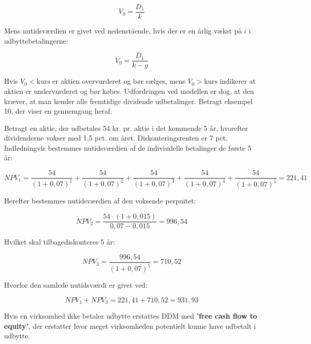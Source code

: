 \documentclass[10pt,reqno, usenames]{article}
\begin{document}
\begin{equation}
        V_0 = \frac{D_1}{k}
\end{equation}

Mens nutidsværdien er givet ved nedenstående, hvis der er en årlig vækst på $i$ i udbyttebetalingerne: 

\begin{equation}
        V_0 = \frac{D_1}{k - g}
\end{equation}

Hvis $V_0 < \text{kurs}$ er aktien overvurderet og bør sælges, mens $V_0 > \text{kurs}$ indikerer at aktien er undervurderet og bør købes. Udfordringen ved modellen er dog, at den kræver, at man kender alle fremtidige dividende udbetalinger. Betragt eksempel 10, der viser en gennemgang heraf. 

\begin{tcolorbox}[breakable, colback=red!5!white, colframe=red!50!black, title= Eksempel 10: Beregning af fundamental værdi for et værdipapir]
Betragt en aktie, der udbetales 54 kr. pr. aktie i det kommende 5 år, hvorefter dividenderne vokser med 1,5 pct. om året. Diskonteringsrenten er 7 pct. Indledningvis bestemmes nutidsværdien af de indiviudelle betalinger de første 5 år: 

\begin{equation*}
    NPV_{1} = \frac{54}{(1+0,07)^1} + \frac{54}{(1+0,07)^2} + \frac{54}{(1+0,07)^3} + \frac{54}{(1+0,07)^4} + \frac{54}{(1+0,07)^5} = 221,41
\end{equation*}

Herefter bestemmes nutidsværdien af den voksende perpuitet: 

\begin{equation*}
    NPV_{2} = \frac{54 \cdot (1+0,015)}{0,07 - 0,015} = 996,54
\end{equation*}

Hvilket skal tilbagediskonteres 5 år: 

\begin{equation*}
    NPV_{3} = \frac{996,54}{(1+0,07)^5} = 710,52
\end{equation*}

Hvorfor den samlede nutidsværdi er givet ved: 

\begin{equation*}
    NPV_1 + NPV_3 = 221,41 + 710,52 = 931,93
\end{equation*}
\end{tcolorbox}

Hvis en virksomhed ikke betaler udbytte erstattes DDM med \textbf{'free cash flow to equity'}, der erstatter hvor meget virksomheden potentielt kunne have udbetalt i udbytte. 
\end{document}

